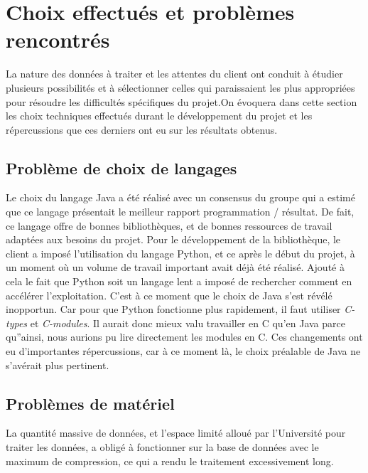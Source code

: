 \chapter{Choix effectués et problèmes rencontrés}

La nature des données à traiter et les attentes du client ont conduit à étudier plusieurs possibilités et à sélectionner celles qui paraissaient les plus appropriées pour résoudre les difficultés spécifiques du projet.On évoquera dans cette section les choix techniques effectués durant le développement du projet et les répercussions que ces derniers ont eu sur les résultats obtenus. 

\section{Problème de choix de langages}
Le choix du langage Java a été réalisé avec un consensus du groupe qui a estimé que ce langage présentait le meilleur rapport programmation / résultat. De fait, ce langage offre de bonnes bibliothèques, et de bonnes ressources de travail adaptées aux besoins du projet. 
Pour le développement de la bibliothèque, le client a imposé l'utilisation du langage Python, et ce après le début du projet, à un moment où un volume de travail important avait déjà été réalisé. Ajouté à cela le fait que Python soit un langage lent a imposé de rechercher comment en accélérer l'exploitation. C'est à ce moment que le choix de Java s'est révélé inopportun. Car pour que Python fonctionne plus rapidement, il faut utiliser \textit{C-types} et \textit{C-modules}. Il aurait donc mieux valu travailler en C qu'en Java parce qu''ainsi, nous aurions pu lire directement les modules en C. Ces changements ont eu d'importantes répercussions, car à ce moment là, le choix préalable de Java ne s'avérait plus pertinent.  

\section{Problèmes de matériel}
La quantité massive de données, et l'espace limité alloué par l'Université pour traiter les données, a obligé à fonctionner sur la base de données avec le maximum de compression, ce qui a rendu le traitement excessivement long.